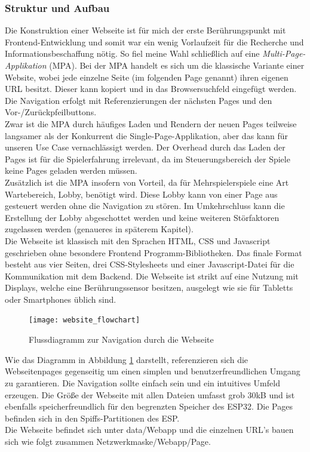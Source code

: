 \documentclass[12pt,a4paper]{article}
\begin{document}
\subsubsection{Struktur und Aufbau}
Die Konstruktion einer Webseite ist für mich der erste Berührungspunkt mit Frontend-Entwicklung und somit war ein wenig Vorlaufzeit für die Recherche und Informationsbeschaffung nötig. So fiel meine Wahl schließlich auf eine \textit{Multi-Page-Applikation} (MPA). Bei der MPA handelt es sich um die \glqq klassische\grqq{} Variante einer Website, wobei jede einzelne Seite (im folgenden \glqq Page\grqq{} genannt) ihren eigenen URL besitzt. Dieser kann kopiert und in das Browsersuchfeld eingefügt werden. Die Navigation erfolgt mit Referenzierungen der nächsten Pages und den Vor-/Zurückpfeilbuttons.
\vspace{1.5ex}\\
Zwar ist die MPA durch häufiges Laden und Rendern der neuen Pages teilweise langsamer als der Konkurrent die \glqq Single-Page-Applikation\grqq{}, aber das kann für unseren Use Case vernachlässigt werden. Der Overhead durch das Laden der Pages ist für die Spielerfahrung irrelevant, da im Steuerungsbereich der Spiele keine Pages geladen werden müssen.
\vspace{1.5ex}\\
Zusätzlich ist die MPA insofern von Vorteil, da für Mehrspielerspiele eine Art Wartebereich, \glqq Lobby\grqq{}, benötigt wird. Diese Lobby kann von einer Page aus gesteuert werden ohne die Navigation zu stören. Im Umkehrschluss kann die Erstellung der Lobby \glqq abgeschottet\grqq{} werden und keine weiteren Störfaktoren zugelassen werden (genaueres in späterem Kapitel). 
\vspace{1.5ex}\\
Die Webseite ist klassisch mit den Sprachen HTML, CSS und Javascript geschrieben ohne besondere Frontend Programm-Bibliotheken. Das finale Format besteht aus vier Seiten, drei CSS-\glqq Stylesheets\grqq{} und einer Javascript-Datei für die Kommunikation mit dem Backend. Die Webseite ist strikt auf eine Nutzung mit Displays, welche eine Berührungssensor besitzen, ausgelegt wie sie für Tabletts oder Smartphones üblich sind. 
\newpage

\begin{figure}[h]
\centering
\texttt{[image: website\_flowchart]}
\caption{\label{fig:flowchart1}Flussdiagramm zur Navigation durch die Webseite}
\end{figure}

Wie das Diagramm in Abbildung \ref{fig:flowchart1} darstellt, referenzieren sich die Webseitenpages gegenseitig um einen simplen und benutzerfreundlichen Umgang zu garantieren. Die Navigation sollte einfach sein und ein intuitives Umfeld erzeugen. Die Größe der Webseite mit allen Dateien umfasst grob 30kB und ist ebenfalls speicherfreundlich für den begrenzten Speicher des ESP32. 
Die Pages befinden sich in den Spiffs-Partitionen des ESP. 
\vspace{1.5ex}\\
Die Webseite befindet sich unter \glqq data/Webapp\grqq{} und die einzelnen URL's bauen sich wie folgt zusammen \glqq Netzwerkmaske/Webapp/Page\grqq{}.
\newpage
\end{document}

